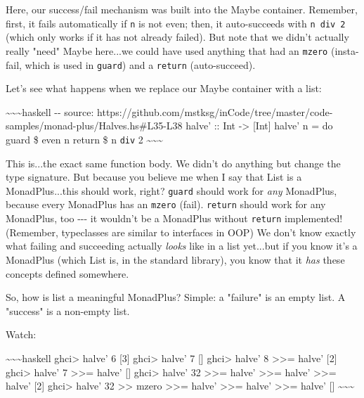 \documentclass[]{article}
\begin{document}
Here, our success/fail mechanism was built into the Maybe container. Remember,
first, it fails automatically if \texttt{n} is not even; then, it auto-succeeds
with \texttt{n\ \textasciigrave{}div\textasciigrave{}\ 2} (which only works if
it has not already failed). But note that we didn't actually really "need" Maybe
here...we could have used anything that had an \texttt{mzero} (insta-fail, which
is used in \texttt{guard}) and a \texttt{return} (auto-succeed).

Let's see what happens when we replace our Maybe container with a list:

\textasciitilde{}\textasciitilde{}\textasciitilde{}haskell -\/- source:
https://github.com/mstksg/inCode/tree/master/code-samples/monad-plus/Halves.hs\#L35-L38
halve' :: Int -\textgreater{} {[}Int{]} halve' n = do guard \$ even n return \$
n \texttt{div} 2 \textasciitilde{}\textasciitilde{}\textasciitilde{}

This is...the exact same function body. We didn't do anything but change the
type signature. But because you believe me when I say that List is a
MonadPlus...this should work, right? \texttt{guard} should work for \emph{any}
MonadPlus, because every MonadPlus has an \texttt{mzero} (fail). \texttt{return}
should work for any MonadPlus, too -\/-\/- it wouldn't be a MonadPlus without
\texttt{return} implemented! (Remember, typeclasses are similar to interfaces in
OOP) We don't know exactly what failing and succeeding actually \emph{looks}
like in a list yet...but if you know it's a MonadPlus (which List is, in the
standard library), you know that it \emph{has} these concepts defined somewhere.

So, how is list a meaningful MonadPlus? Simple: a "failure" is an empty list. A
"success" is a non-empty list.

Watch:

\textasciitilde{}\textasciitilde{}\textasciitilde{}haskell ghci\textgreater{}
halve' 6 {[}3{]} ghci\textgreater{} halve' 7 {[}{]} ghci\textgreater{} halve' 8
\textgreater{}\textgreater{}= halve' {[}2{]} ghci\textgreater{} halve' 7
\textgreater{}\textgreater{}= halve' {[}{]} ghci\textgreater{} halve' 32
\textgreater{}\textgreater{}= halve' \textgreater{}\textgreater{}= halve'
\textgreater{}\textgreater{}= halve' {[}2{]} ghci\textgreater{} halve' 32
\textgreater{}\textgreater{} mzero \textgreater{}\textgreater{}= halve'
\textgreater{}\textgreater{}= halve' \textgreater{}\textgreater{}= halve' {[}{]}
\textasciitilde{}\textasciitilde{}\textasciitilde{}
\end{document}
